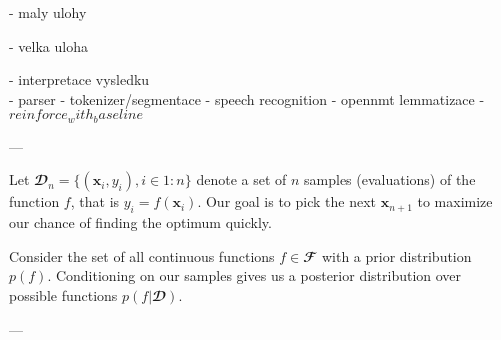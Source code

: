 - maly ulohy

- velka uloha

- interpretace vysledku
\\





- parser
- tokenizer/segmentace
- speech recognition
- opennmt lemmatizace
- $reinforce_with_baseline$





---

Let $𝓓_n = \{ (\symbf{x}_i, y_i), i \in 1:n\}$ denote a set of $n$ samples
(evaluations) of the function $f$, that is $y_i = f(\symbf{x}_i)$. Our goal is
to pick the next $\symbf{x}_{n+1}$ to maximize our chance of finding the
optimum quickly.

Consider the set of all continuous functions $f ∈ 𝓕$ with a prior distribution
$p(f)$.  Conditioning on our samples gives us a posterior distribution over
possible functions $p(f | 𝓓)$.

---

